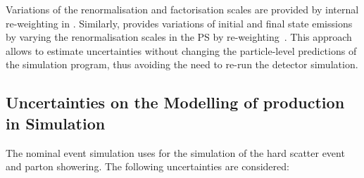 Variations of the renormalisation and factorisation scales are provided by
internal re-weighting in \POWHEGBOX[v2]. Similarly, \PYTHIA[8] provides
variations of initial and final state emissions by varying the renormalisation
scales in the PS by re-weighting~\cite{Mrenna:2016sih,pythia-variations-online}.
This approach allows to estimate uncertainties without changing the
particle-level predictions of the simulation program, thus avoiding the need to
re-run the detector simulation.


\subsection{Uncertainties on the Modelling of \Zjets production in Simulation}%
\label{app:zjets_uncertainties}

The nominal \Zjets event simulation uses \SHERPA[2.2.1] for the simulation of
the hard scatter event and parton showering. The following uncertainties are
considered:
